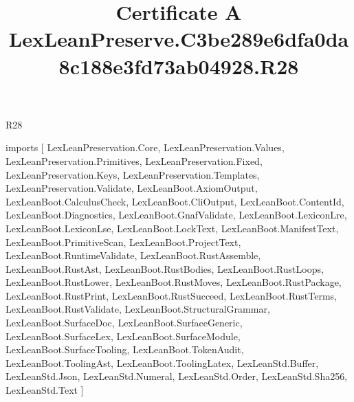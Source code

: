\begin{lexlean}{R28}
\title{Certificate A LexLeanPreserve.C3be289e6dfa0da8c188e3fd73ab04928.R28}
\begin{coremodule}
imports [
  LexLeanPreservation.Core,
  LexLeanPreservation.Values,
  LexLeanPreservation.Primitives,
  LexLeanPreservation.Fixed,
  LexLeanPreservation.Keys,
  LexLeanPreservation.Templates,
  LexLeanPreservation.Validate,
  LexLeanBoot.AxiomOutput,
  LexLeanBoot.CalculusCheck,
  LexLeanBoot.CliOutput,
  LexLeanBoot.ContentId,
  LexLeanBoot.Diagnostics,
  LexLeanBoot.GnafValidate,
  LexLeanBoot.LexiconLre,
  LexLeanBoot.LexiconLse,
  LexLeanBoot.LockText,
  LexLeanBoot.ManifestText,
  LexLeanBoot.PrimitiveScan,
  LexLeanBoot.ProjectText,
  LexLeanBoot.RuntimeValidate,
  LexLeanBoot.RustAssemble,
  LexLeanBoot.RustAst,
  LexLeanBoot.RustBodies,
  LexLeanBoot.RustLoops,
  LexLeanBoot.RustLower,
  LexLeanBoot.RustMoves,
  LexLeanBoot.RustPackage,
  LexLeanBoot.RustPrint,
  LexLeanBoot.RustSucceed,
  LexLeanBoot.RustTerms,
  LexLeanBoot.RustValidate,
  LexLeanBoot.StructuralGrammar,
  LexLeanBoot.SurfaceDoc,
  LexLeanBoot.SurfaceGeneric,
  LexLeanBoot.SurfaceLex,
  LexLeanBoot.SurfaceModule,
  LexLeanBoot.SurfaceTooling,
  LexLeanBoot.TokenAudit,
  LexLeanBoot.ToolingAst,
  LexLeanBoot.ToolingLatex,
  LexLeanStd.Buffer,
  LexLeanStd.Json,
  LexLeanStd.Numeral,
  LexLeanStd.Order,
  LexLeanStd.Sha256,
  LexLeanStd.Text
]


\end{coremodule}
\end{lexlean}
